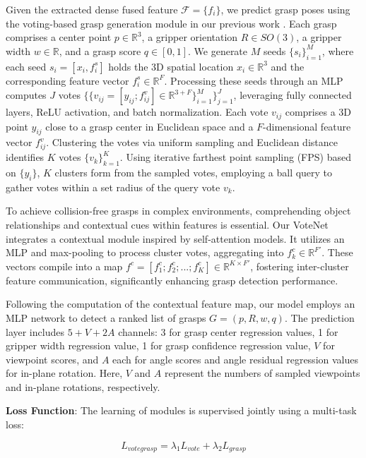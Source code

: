 Given the extracted dense fused feature $\mathcal{F}=\lbrace{f_i}\rbrace$, we predict grasp poses using the voting-based grasp generation module in our previous work \cite{hoang2023grasp}. Each grasp comprises a center point $p \in \mathbb{R}^3$, a gripper orientation $R \in SO(3)$, a gripper width $w \in \mathbb{R}$, and a grasp score $q \in [0,1]$. We generate $M$ seeds $\lbrace{s_i}\rbrace^{M}_{i=1}$, where each seed $s_i=[x_i,f_i^s]$ holds the 3D spatial location $x_i \in \mathbb{R}^{3}$ and the corresponding feature vector $f_i^s \in \mathbb{R}^{F}$. Processing these seeds through an MLP computes $J$ votes $ \lbrace \lbrace v_{ij}=[y_{ij};f_{ij}^v] \in \mathbb{R}^{3+F} \rbrace_{i=1}^{M} \rbrace_{j=1}^{J}$, leveraging fully connected layers, ReLU activation, and batch normalization. Each vote $v_{ij}$ comprises a 3D point $y_{ij}$ close to a grasp center in Euclidean space and a $F$-dimensional feature vector $f_{ij}^v$. Clustering the votes via uniform sampling and Euclidean distance identifies $K$ votes $\lbrace v_{k}\rbrace_{k=1}^{K}$. Using iterative farthest point sampling (FPS) based on $\lbrace {y_{i}} \rbrace$, $K$ clusters form from the sampled votes, employing a ball query to gather votes within a set radius of the query vote $v_{k}$.

To achieve collision-free grasps in complex environments, comprehending object relationships and contextual cues within features is essential. Our VoteNet integrates a contextual module inspired by self-attention models. It utilizes an MLP and max-pooling to process cluster votes, aggregating into $f_{k}^c \in \mathbb{R}^{F'}$. These vectors compile into a map $f^c = [f_{1}^c; f_{2}^c;...; f_{K}^c ] \in \mathbb{R}^{K \times F'} $, fostering inter-cluster feature communication, significantly enhancing grasp detection performance.

Following the computation of the contextual feature map, our model employs an MLP network to detect a ranked list of grasps $G=(p,R,w,q)$. The prediction layer includes $5+V+2A$ channels: 3 for grasp center regression values, 1 for gripper width regression value, 1 for grasp confidence regression value, $V$ for viewpoint scores, and $A$ each for angle scores and angle residual regression values for in-plane rotation. Here, $V$ and $A$ represent the numbers of sampled viewpoints and in-plane rotations, respectively.

\textbf{Loss Function}: The learning of modules is supervised jointly using a multi-task loss:

\begin{equation}
L_{votegrasp} = \lambda_1 L_{vote} + \lambda_2 L_{grasp}
\label{eq:L_votegrasp_v2}
\end{equation}

